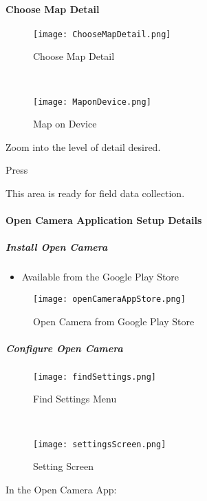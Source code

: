 \vspace{.5in}


\vspace{.2in}

\clearpage
\paragraph[Choose Map Detail]{Choose Map Detail\texorpdfstring{\\}{}}
\begin{wrapfigure}{r}{0.5\textwidth}
\centering
    \texttt{[image: ChooseMapDetail.png]}
\caption{Choose Map Detail}
\vspace{.25in}

\HRule \\[.4cm] %
\vspace{.25in}

    \texttt{[image: MaponDevice.png]}
\caption{Map on Device}
\end{wrapfigure}
Zoom into the level of detail desired.
\vspace{1in}

\noindent Press 
\vspace{3.5in}

\noindent This area is ready for field data collection.
\clearpage
\paragraph{Open Camera Application Setup Details}
\subparagraph{Install Open Camera}
\begin{itemize}
\item Available from the Google Play Store
\end{itemize}
\begin{figure}[h!]
\centering
    \texttt{[image: openCameraAppStore.png]}
\caption{Open Camera from Google Play Store}
\end{figure}

\clearpage
\subparagraph{Configure Open Camera}
\begin{wrapfigure}{r}{0.5\textwidth}
\centering
    \texttt{[image: findSettings.png]}
\caption{Find Settings Menu}
\vspace{.25in}

\HRule \\[.4cm] %
\vspace{.25in}

    \texttt{[image: settingsScreen.png]}
\caption{Setting Screen}
\end{wrapfigure}
In the Open Camera App:
\vspace{2.5in}


